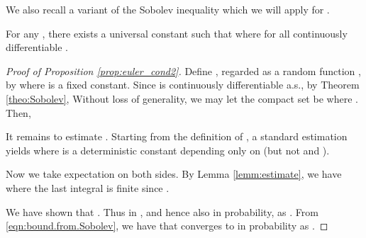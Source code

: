 \documentclass[twoside]{article}
\begin{document}
We also recall a variant of the Sobolev inequality which we will apply for .

\begin{theo}\label{theo:Sobolev}
For any , there exists a universal constant  such that 
where 
for all continuously differentiable .
\end{theo}


\begin{proof}[Proof of Proposition \ref{prop:euler_cond2}]
Define , regarded as a random function , by 
where  is a fixed constant. Since  is continuously differentiable a.s., by Theorem \ref{theo:Sobolev},
Without loss of generality, we may let the compact set be  where . Then,

It remains to estimate . Starting from the definition of , a standard estimation yields
where  is a deterministic constant depending only on  (but not  and ). 

Now we take expectation on both sides. By Lemma \ref{lemm:estimate}, we have
where the last integral is finite since .

We have shown that . Thus  in , and hence also in probability, as . From \eqref{eqn:bound.from.Sobolev}, we have that  converges to  in probability as .
\end{proof}
\end{document}
